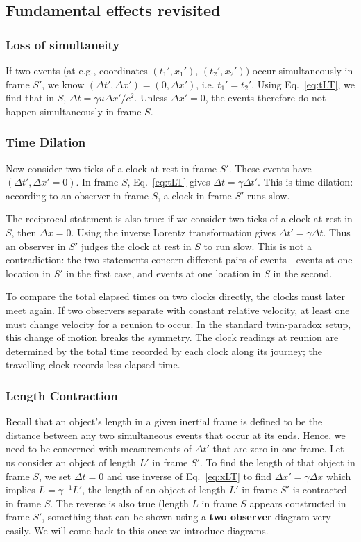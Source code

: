 \documentclass[12pt]{article}
\begin{document}
\subsection{Fundamental effects revisited}

\subsubsection{Loss of simultaneity}
If two events (at e.g., coordinates $(t_1',x_1')$, $(t_2',x_2'))$ occur simultaneously in frame $S'$, we know $(\Delta t',\Delta x') = (0,\Delta x')$, i.e. $t_1'=t_2'$. Using Eq.~\eqref{eq:tLT}, we find that in $S$, $\Delta t= \gamma u \Delta x'/c^2$. Unless $\Delta x' = 0$, the events therefore do not happen simultaneously in frame $S$.

\subsubsection{Time Dilation}
Now consider two ticks of a clock at rest in frame $S'$. These events have $(\Delta t', \Delta x'=0)$. In frame $S$, Eq.~\eqref{eq:tLT} gives $\Delta t = \gamma \Delta t'$. This is time dilation: according to an observer in frame $S$, a clock in frame $S'$ runs slow.

\noindent
The reciprocal statement is also true: if we consider two ticks of a clock at rest in $S$, then $\Delta x=0$. Using the inverse Lorentz transformation gives $\Delta t' = \gamma \Delta t$. Thus an observer in $S'$ judges the clock at rest in $S$ to run slow. This is not a contradiction: the two statements concern different pairs of events---events at one location in $S'$ in the first case, and events at one location in $S$ in the second.

To compare the total elapsed times on two clocks directly, the clocks must later meet again. If two observers separate with constant relative velocity, at least one must change velocity for a reunion to occur. In the standard twin-paradox setup, this change of motion breaks the symmetry. The clock readings at reunion are determined by the total time recorded by each clock along its journey; the travelling clock records less elapsed time.

\subsubsection{Length Contraction}

Recall that an object's length in a given inertial frame is defined to be the distance between any two simultaneous events that occur at its ends. Hence, we need to be concerned with measurements of $\Delta t'$ that are zero in one frame. Let us consider an object of length $L'$ in frame $S'$. To find the length of that object in frame $S$, we set $\Delta t=0$ and use inverse of Eq.~\eqref{eq:xLT} to find $\Delta x' = \gamma \Delta x$ which implies $L = \gamma^{-1} L'$, the length of an object of length $L'$ in frame $S'$ is contracted in frame $S$. The reverse is also true (length $L$ in frame $S$ appears constructed in frame $S'$, something that can be shown using a {\bf two observer} diagram very easily. We will come back to this once we introduce diagrams.
\end{document}
